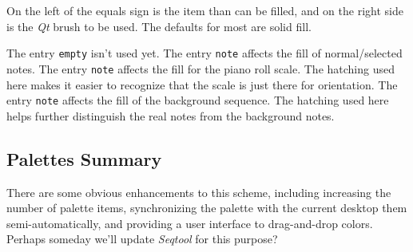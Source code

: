    On the left of the equals sign is the item than can be filled, and on the
   right side is the \textsl{Qt} brush to be used.  The defaults for most are
   solid fill.

   The entry \texttt{empty} isn't used yet.
   The entry \texttt{note} affects the fill of normal/selected notes.
   The entry \texttt{note} affects the fill for the piano roll scale.  The
   hatching used here makes it easier to recognize that the scale is just there
   for orientation.
   The entry \texttt{note} affects the fill of the background sequence.  The
   hatching used here helps further distinguish the real notes from the
   background notes.

\subsection{Palettes Summary}
\label{subsec:palettes_summary}

   There are some obvious enhancements to this scheme, including increasing the
   number of palette items, synchronizing the palette with the current desktop
   them semi-automatically, and providing a user interface to drag-and-drop
   colors.  Perhaps someday we'll update \textsl{Seqtool} for this purpose?

